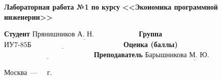 \begin{titlepage}
\begin{center}
\Large\textbf{Лабораторная работа №1 по курсу}
\Large\textbf{\hspace*{38pt}<<Экономика программной инженерии>>}\newline\newline\newline
\end{center}

\noindent\textbf{Студент} $\underline{\text{Прянишников А. Н.~~~~~~~~~~~~~~~~~~}}$\newline\newline
\noindent\textbf{Группа} $\underline{\text{ИУ7-85Б~~~~~~~~~~~~~~~~~~~~~~~~~~~~~~~~~~~~~~}}$\newline\newline
\noindent\textbf{Оценка (баллы)} $\underline{\text{~~~~~~~~~~~~~~~~~~~~~~~~~~~~~~~~~~~~~}}$\newline\newline
\noindent\textbf{Преподаватель} $\underline{\text{Барышникова~М.~Ю.~~~~~~~~~~~~~~~}}$\newline

\begin{center}
\vfill
Москва~---~\the\year
~г.
\end{center}
\restoregeometry
\end{titlepage}